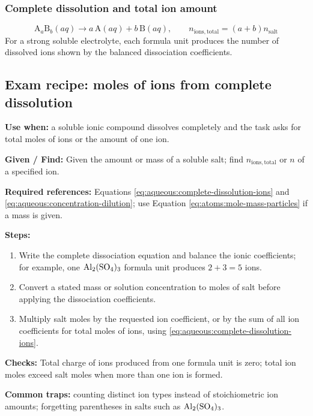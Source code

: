 \subsubsection{Complete dissolution and total ion amount}
\begin{equation}\label{eq:aqueous:complete-dissolution-ions}
\mathrm{A}_a\mathrm{B}_b(aq)\longrightarrow a\,\mathrm{A}(aq)+b\,\mathrm{B}(aq), \qquad
n_{\mathrm{ions,total}}=(a+b)n_{\mathrm{salt}}
\end{equation}
For a strong soluble electrolyte, each formula unit produces the number of dissolved ions shown by the balanced dissociation coefficients.

\subsection{Exam recipe: moles of ions from complete dissolution}
\textbf{Use when:} a soluble ionic compound dissolves completely and the task asks for total moles of ions or the amount of one ion.

\textbf{Given / Find:} Given the amount or mass of a soluble salt; find \(n_{\mathrm{ions,total}}\) or \(n\) of a specified ion.

\textbf{Required references:} Equations \eqref{eq:aqueous:complete-dissolution-ions} and \eqref{eq:aqueous:concentration-dilution}; use Equation \eqref{eq:atoms:mole-mass-particles} if a mass is given.


\textbf{Steps:}
\begin{enumerate}
    \item Write the complete dissociation equation and balance the ionic coefficients; for example, one \(\ce{Al2(SO4)3}\) formula unit produces \(2+3=5\) ions.
    \item Convert a stated mass or solution concentration to moles of salt before applying the dissociation coefficients.
    \item Multiply salt moles by the requested ion coefficient, or by the sum of all ion coefficients for total moles of ions, using \eqref{eq:aqueous:complete-dissolution-ions}.
\end{enumerate}

\textbf{Checks:} Total charge of ions produced from one formula unit is zero; total ion moles exceed salt moles when more than one ion is formed.

\textbf{Common traps:} counting distinct ion types instead of stoichiometric ion amounts; forgetting parentheses in salts such as \(\ce{Al2(SO4)3}\).

